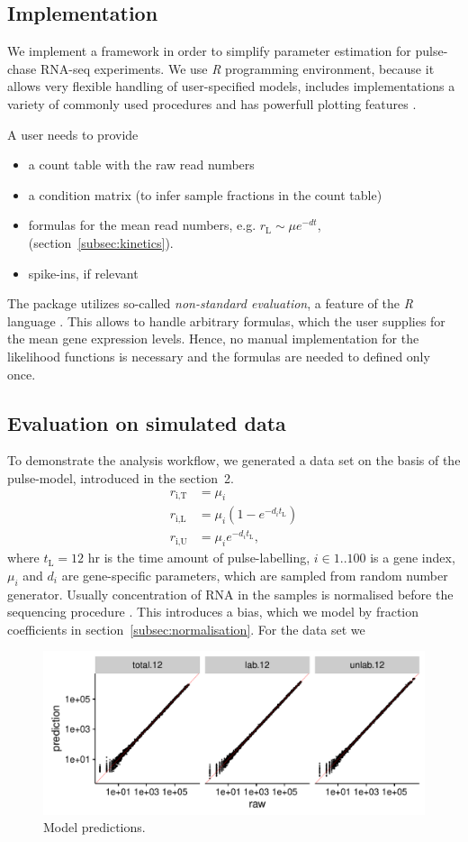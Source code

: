 \subsection{Implementation}
We implement a framework in order  to simplify parameter estimation for 
pulse-chase RNA-seq experiments. 
We use \emph{R} programming environment, 
because it allows very flexible handling of user-specified models, 
includes implementations a variety of commonly used procedures and 
has powerfull plotting features \citep{rlang}.
\par A user needs to provide
\begin{itemize}
 \item a count table with the raw read numbers
 \item a condition matrix (to infer sample fractions in the count table)
 \item formulas for the mean read numbers, e.g. 
 $r_\text{L}\sim \mu e^{-dt}$, (section~\ref{subsec:kinetics}).
 \item spike-ins, if relevant
\end{itemize}
The package utilizes so-called \emph{non-standard evaluation},
a feature of the \emph{R} language \citep{team2000r}.
This allows to handle arbitrary formulas, which the user supplies for 
the mean gene expression levels. Hence, no manual 
implementation for the likelihood functions is necessary and the 
formulas are needed to defined only once.
\subsection{Evaluation on simulated data}
To demonstrate the analysis workflow, we generated a data 
set on the basis of the pulse-model, introduced in the section~2.
\begin{align}
 r_\text{i,T}&=\mu_i\\
 r_\text{i,L}&=\mu_i \left(1-e^{-d_it_\text{L}}\right)\\
 r_\text{i,U}&=\mu_i e^{-d_it_\text{L}},
\end{align}
where $t_\text{L} = 12$ hr is the time amount of pulse-labelling,
$i \in 1..100$ is a gene index, $\mu_i$ and $d_i$ are gene-specific parameters,
which are sampled from random number generator.
Usually concentration of RNA in the samples is normalised before the
sequencing procedure \citep{}. This introduces a bias, which 
we model by fraction coefficients in section~\ref{subsec:normalisation}. 
For the data set we 

\begin{figure}
 \includegraphics[width=\linewidth]{fig/predictions}
 \caption{Model predictions.}
\end{figure}

